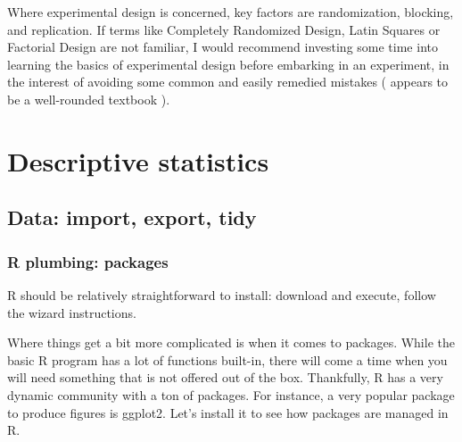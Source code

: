 \documentclass{report}
\begin{document}
		Where experimental design is concerned, key factors are randomization, blocking, and replication. If terms like Completely Randomized Design, Latin Squares or Factorial Design are not familiar, I would recommend investing some time into learning the basics of experimental design before embarking in an experiment, in the interest of avoiding some common and easily remedied mistakes (\cite{doe} appears to be a well-rounded textbook ).

\chapter{Descriptive statistics}
	\section{Data: import, export, tidy}\label{sec:data-import}
		\subsection{R plumbing: packages}
		R \cite{R} should be relatively straightforward to install: download and execute, follow the wizard instructions.
	
		Where things get a bit more complicated is when it comes to packages. While the basic R program has a lot of functions built-in, there will come a time when you will need something that is not offered out of the box. Thankfully, R has a very dynamic community with a ton of packages. For instance, a very popular package to produce figures is ggplot2. Let's install it to see how packages are managed in R.
	
\end{document}
